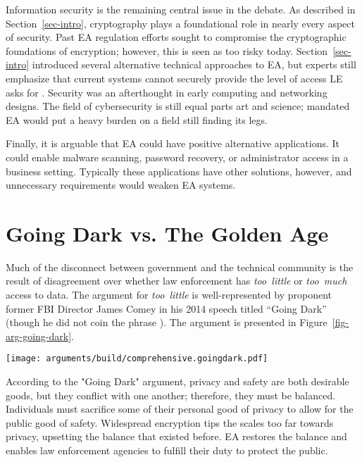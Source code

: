 \documentclass{IEEEtran}
\def\ii#1{\mbox{\textit{#1}}}
\newcommand{\myfig}[1]{Figure~\ref{#1}}
\newcommand{\mysec}[1]{Section~\ref{#1}}
\begin{document}
Information security is the remaining central issue in the debate. As described in \mysec{sec-intro}, \ac{cryptography}
plays a foundational role in nearly every aspect of security. Past \ac{EA} regulation efforts sought to compromise the
cryptographic foundations of encryption; however, this is seen as too risky today. \mysec{sec-intro} introduced several
alternative technical approaches to \ac{EA}, but experts still emphasize that current systems cannot securely provide
the level of access \acl{LE} asks for \cite{abelson_2015} \cite{abelson_risks_1997}. Security was an afterthought in
early computing and networking designs. The field of cybersecurity is still equal parts art and science; mandated
\ac{EA} would put a heavy burden on a field still finding its legs.


Finally, it is arguable that \ac{EA} could have positive alternative applications. It could enable malware scanning,
password recovery, or administrator access in a business setting. Typically these applications have other solutions,
however, and unnecessary requirements would weaken \ac{EA} systems.


\section{Going Dark vs. The Golden Age}

Much of the disconnect between government and the technical community is the result of disagreement over whether law
enforcement has \ii{too little} or \ii{too much} access to data. The argument for \ii{too little} is well-represented by
proponent former \ac{FBI} Director James Comey in his 2014 speech titled ``Going Dark'' \cite{comey_2014} (though he did
not coin the phrase \cite{swire_encryption_2011}). The argument is presented in \myfig{fig-arg-going-dark}.

\begin{figure*}[t!]
  \centering
  \texttt{[image: arguments/build/comprehensive.goingdark.pdf]}
  \caption{A ``Going Dark'' Argument Map}
  \label{fig-arg-going-dark}
\end{figure*}

According to the "Going Dark" argument, privacy and safety are both desirable goods, but they conflict with one another;
therefore, they must be balanced. Individuals must sacrifice some of their personal good of privacy to allow for the
public good of safety. Widespread encryption tips the scales too far towards privacy, upsetting the balance that existed
before. \ac{EA} restores the balance and enables law enforcement agencies to fulfill their duty to protect the public.
\end{document}
